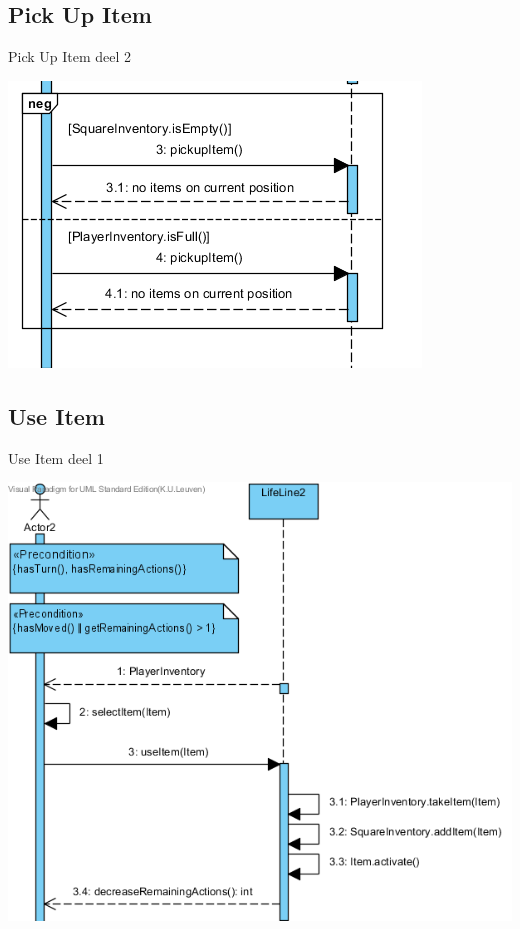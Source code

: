 \documentclass[t]{beamer}
\begin{document}
\subsection{Pick Up Item}
\begin{frame}{Pick Up Item deel 2}
\begin{center}
\includegraphics[scale=0.9]{images/SSDPickUpItem2}
\end{center}
\end{frame}


\subsection{Use Item}
\begin{frame}{Use Item deel 1}
\begin{center}
\includegraphics[scale=0.5]{images/SSDUseItem1}
\end{center}
\end{frame}
\end{document}
